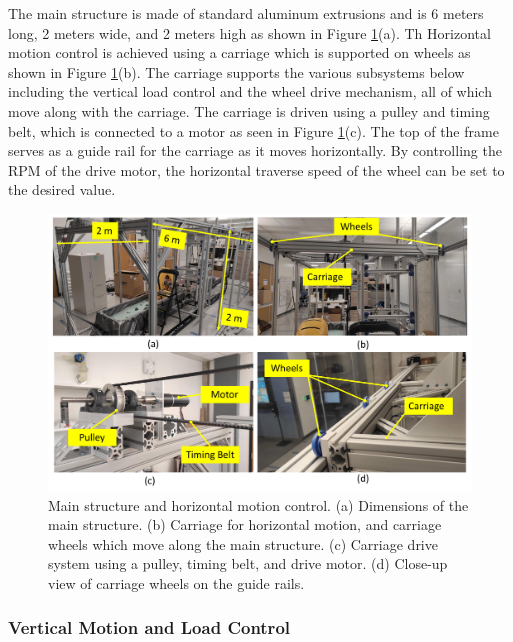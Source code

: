 \documentclass{article}
\begin{document}
The main structure is made of standard aluminum extrusions and is 6 meters long, 2 meters wide, and 2 meters high as shown in Figure \ref{fig:carriage}(a). Th Horizontal motion control is achieved using a carriage which is supported on wheels as shown in Figure \ref{fig:carriage}(b). The carriage supports the various subsystems below including the vertical load control and the wheel drive mechanism, all of which move along with the carriage. The carriage is driven using a pulley and timing belt, which is connected to a motor as seen in Figure \ref{fig:carriage}(c). The top of the frame serves as a guide rail for the carriage as it moves horizontally. By controlling the RPM of the drive motor, the horizontal traverse speed of the wheel can be set to the desired value.
\begin{figure}[hbt!]
\centering
\includegraphics[width=6.55in]{test-rig-images/carriage.pdf}
\caption{Main structure and horizontal motion control. (a) Dimensions of the main structure. (b) Carriage for horizontal motion, and carriage wheels which move along the main structure. (c) Carriage drive system using a pulley, timing belt, and drive motor. (d) Close-up view of carriage wheels on the guide rails. }
\label{fig:carriage}
\end{figure}





\subsubsection{Vertical Motion and Load Control}
\label{subsubsec:vertical-motion-control}
\end{document}
